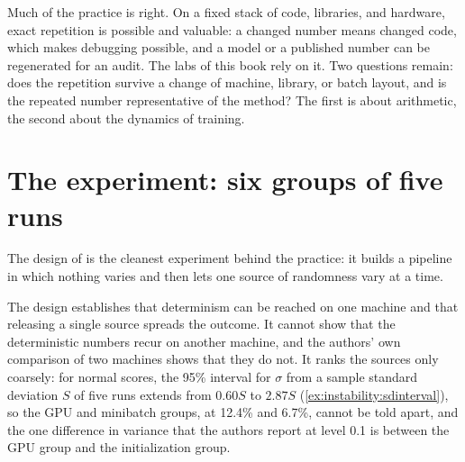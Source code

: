 \begin{refsection}
Much of the practice is right. On a fixed stack of code, libraries, and hardware, exact repetition is possible and valuable: a changed number means changed code, which makes debugging possible, and a model or a published number can be regenerated for an audit. The labs of this book rely on it. Two questions remain: does the repetition survive a change of machine, library, or batch layout, and is the repeated number representative of the method? The first is about arithmetic, the second about the dynamics of training.

\section{The experiment: six groups of five runs}\label{sec:instability:experiment}

The design of \textcite{NagarajanEtAl2018} is the cleanest experiment behind the practice: it builds a pipeline in which nothing varies and then lets one source of randomness vary at a time.

\begin{experiment}
\end{experiment}

The design establishes that determinism can be reached on one machine and that releasing a single source spreads the outcome. It cannot show that the deterministic numbers recur on another machine, and the authors' own comparison of two machines shows that they do not. It ranks the sources only coarsely: for normal scores, the 95\% interval for $\sigma$ from a sample standard deviation $S$ of five runs extends from $0.60S$ to $2.87S$ (\cref{ex:instability:sdinterval}), so the GPU and minibatch groups, at 12.4\% and 6.7\%, cannot be told apart, and the one difference in variance that the authors report at level 0.1 is between the GPU group and the initialization group.


\end{refsection}
